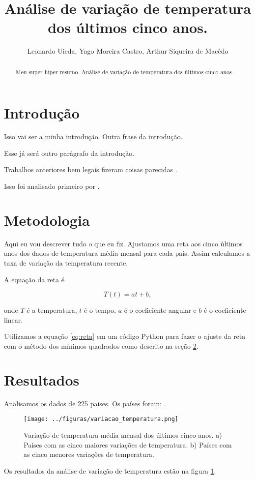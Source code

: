\documentclass{article}
\newcommand{\Title}{Análise de variação de temperatura dos últimos cinco anos.}
\begin{document}
\title{\Title}
\author{Leonardo Uieda, Yago Moreira Castro, Arthur Siqueira de Macêdo}

\maketitle

\begin{abstract}
Meu super hiper resumo. \Title

\end{abstract}

\section{Introdução}
\label{sec:intro}
Isso vai ser a minha introdução.
Outra frase da introdução.

Esse já será outro parágrafo da introdução.

Trabalhos anteriores bem legais fizeram coisas parecidas
\citep{Hansen2010}.

Isso foi analisado primeiro por \citet{Hansen2010}.

\section{Metodologia}
\label{sec:metodologia}
Aqui eu vou descrever tudo o que eu fiz.
Ajustamos uma reta aos cinco últimos anos dos dados
de temperatura média mensal para cada país.
Assim calculamos a taxa de variação da temperatura recente.

A equação da reta é

\begin{equation}
T(t) = a t + b,
\label{eq:reta}
\end{equation}

\noindent
onde $T$ é a temperatura, $t$ é o tempo, 
$a$ é o coeficiente angular e $b$ é o coeficiente linear.

Utilizamos a equação \ref{eq:reta} em um código Python para fazer 
o ajuste da reta com o método dos mínimos quadrados como descrito na seção \ref{sec:metodologia}.

\section{Resultados}
\label{sec:resultados}

Analisamos os dados de 225 países.
Os países foram: \Paises.

\begin{figure}[!htb] %
	\centering
	\texttt{[image: ../figuras/variacao\_temperatura.png]}
	\caption{
		Variação de temperatura média mensal dos últimos cinco anos. 
		a) Países com as cinco maiores variações de temperatura.
		b) Países com as cinco menores variações de temperatura.
	}
\label{fig:varia_temp}
\end{figure} 
Os resultados da análise de variação de temperatura estão na figura \ref{fig:varia_temp}.



\end{document}
